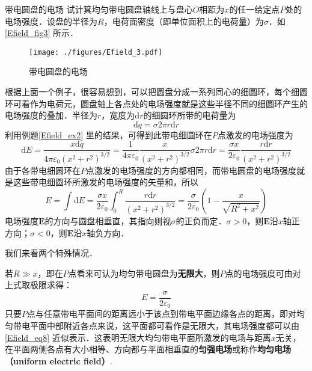  
\begin{example}{带电圆盘的电场}\label{Efield_ex3}
试计箕均匀带电圆盘轴线上与盘心$O$相距为$x$的任一给定点$P$处的电场强度．设盘的半径为$R$，电荷面密度（即单位面积上的电荷量）为$\sigma$．如\autoref{Efield_fig3} 所示．

\begin{figure}[ht]
\centering
\texttt{[image: ./figures/Efield\_3.pdf]}
\caption{带电圆盘的电场} \label{Efield_fig3}
\end{figure}

根据上面一个例子，很容易想到，可以把圆盘分成一系列同心的细圆环，每个细圆环可看作为电荷元，圆盘轴上各点处的电场强度就是这些半径不同的细圆环产生的电场强度的叠加．半径为$r$，宽度为$\mathrm dr$的细圆环所带的电荷量为
\begin{equation}
\mathrm{d} q=\sigma 2 \pi r \mathrm{d} r
\end{equation}
利用例题\autoref{Efield_ex2} 里的结果，可得到此带电细圆环在$P$点激发的电场强度为
\begin{equation}
\mathrm{d} E=\frac{x \mathrm{d} q}{4 \pi \varepsilon_{0}\left(x^{2}+r^{2}\right)^{3 / 2}}=\frac{1}{4 \pi \varepsilon_{0}} \frac{x}{\left(x^{2}+r^{2}\right)^{3 / 2}} \sigma 2 \pi r \mathrm{d} r=\frac{\sigma x}{2 \varepsilon_{0}} \frac{r \mathrm{d} r}{\left(x^{2}+r^{2}\right)^{3 / 2}}
\end{equation}
由于各带电细圆环在$P$点激发的电场强度的方向都相同，而带电圆盘的电场强度就是这些带电细圆环所激发的电场强度的矢量和，所以
\begin{equation}\label{Efield_eq7}
E=\int \mathrm{d} E=\frac{\sigma x}{2 \varepsilon_{0}} \int_{0}^{R} \frac{r \mathrm{d} r}{\left(x^{2}+r^{2}\right)^{3 / 2}}=\frac{\sigma}{2 \varepsilon_{0}}\left(1-\frac{x}{\sqrt{R^{2}+x^{2}}}\right)
\end{equation}
电场强度$\mathbf E$的方向与圆盘相垂直，其指向则视$\sigma$的正负而定．$\sigma>0$，则$\mathbf E$沿$x$轴正方向；$\sigma<0$，则$\mathbf E$沿$x$轴负方向．

我们来看两个特殊情况．

若$R\gg x$，即在$P$点看来可认为均匀带电圆盘为\textbf{无限大}，则$P$点的电场强度可由对上式取极限求得：
\begin{equation} \label{Efield_eq8}
E=\frac{\sigma}{2 \varepsilon_{0}}
\end{equation}
只要$P$点与任意带电平面间的距离远小于该点到带电平面边缘各点的距离，即对均匀带电平面中部附近各点来说，这平面都可看作是无限大，其电场强度都可以由\autoref{Efield_eq8} 近似表示．这表明无限大均匀带电平面所激发的电场与距离$x$无关，在平面两侧各点有大小相等、方向都与平面相垂直的\textbf{匀强电场}或称作\textbf{均匀电场（uniform electric field）}.


\end{example}

